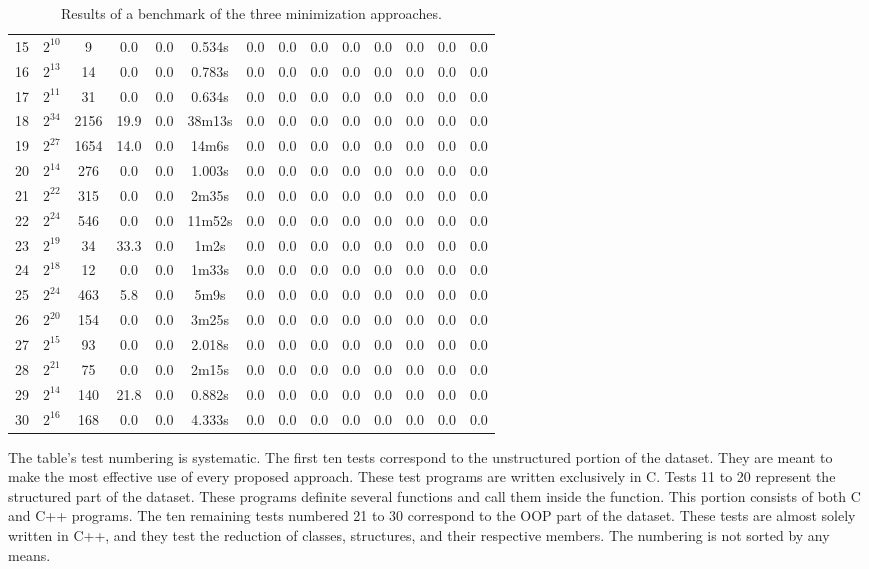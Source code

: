 \begin{table}[b!]
\begin{tabular}{SSSSSSSSSSSSSS}
    15 & {$2^{10}$} & 9 & 0.0 & 0.0 & 0.534s & 0.0 & 0.0 & 0.0 & 0.0 & 0.0 & 0.0 & 0.0 & 0.0  \\
    16 & {$2^{13}$} & 14 & 0.0 & 0.0 & 0.783s & 0.0 & 0.0 & 0.0 & 0.0 & 0.0 & 0.0 & 0.0 & 0.0  \\
    17 & {$2^{11}$} & 31 & 0.0 & 0.0 & 0.634s & 0.0 & 0.0 & 0.0 & 0.0 & 0.0 & 0.0 & 0.0 & 0.0  \\
    18 & {$2^{34}$} & 2156 & 19.9 & 0.0 & 38m13s & 0.0 & 0.0 & 0.0 & 0.0 & 0.0 & 0.0 & 0.0 & 0.0  \\
    19 & {$2^{27}$} & 1654 & 14.0 & 0.0 & 14m6s & 0.0 & 0.0 & 0.0 & 0.0 & 0.0 & 0.0 & 0.0 & 0.0  \\
    20 & {$2^{14}$} & 276 & 0.0 & 0.0 & 1.003s & 0.0 & 0.0 & 0.0 & 0.0 & 0.0 & 0.0 & 0.0 & 0.0  \\  & {$2^{22}$} & 315 & 0.0 & 0.0 & 2m35s & 0.0 & 0.0 & 0.0 & 0.0 & 0.0 & 0.0 & 0.0 & 0.0  \\
    22 & {$2^{24}$} & 546 & 0.0 & 0.0 & 11m52s & 0.0 & 0.0 & 0.0 & 0.0 & 0.0 & 0.0 & 0.0 & 0.0  \\
    23 & {$2^{19}$} & 34 & 33.3 & 0.0 & 1m2s & 0.0 & 0.0 & 0.0 & 0.0 & 0.0 & 0.0 & 0.0 & 0.0  \\
    24 & {$2^{18}$} & 12 & 0.0 & 0.0 & 1m33s & 0.0 & 0.0 & 0.0 & 0.0 & 0.0 & 0.0 & 0.0 & 0.0  \\
    25 & {$2^{24}$} & 463 & 5.8 & 0.0 & 5m9s & 0.0 & 0.0 & 0.0 & 0.0 & 0.0 & 0.0 & 0.0 & 0.0  \\
    26 & {$2^{20}$} & 154 & 0.0 & 0.0 & 3m25s & 0.0 & 0.0 & 0.0 & 0.0 & 0.0 & 0.0 & 0.0 & 0.0  \\
    27 & {$2^{15}$} & 93 & 0.0 & 0.0 & 2.018s & 0.0 & 0.0 & 0.0 & 0.0 & 0.0 & 0.0 & 0.0 & 0.0  \\
    28 & {$2^{21}$} & 75 & 0.0 & 0.0 & 2m15s & 0.0 & 0.0 & 0.0 & 0.0 & 0.0 & 0.0 & 0.0 & 0.0  \\
    29 & {$2^{14}$} & 140 & 21.8 & 0.0 & 0.882s & 0.0 & 0.0 & 0.0 & 0.0 & 0.0 & 0.0 & 0.0 & 0.0  \\
    30 & {$2^{16}$} & 168 & 0.0 & 0.0 & 4.333s & 0.0 & 0.0 & 0.0 & 0.0 & 0.0 & 0.0 & 0.0 & 0.0  \\ \bottomrule
\end{tabular}
\caption{Results of a benchmark of the three minimization approaches.}
\label{tab:results}
\end{table}

The table's test numbering is systematic. 
The first ten tests correspond to the unstructured portion of the dataset. 
They are meant to make the most effective use of every proposed approach. 
These test programs are written exclusively in C. Tests 11 to 20 represent 
the structured part of the dataset. 
These programs definite several functions and call them inside 
the  function. 
This portion consists of both C and C++ programs.
The ten remaining tests numbered 21 to 30 correspond to the OOP part of 
the dataset. 
These tests are almost solely written in C++, and they test the reduction 
of classes, structures, and their respective members.
The numbering is not sorted by any means.

